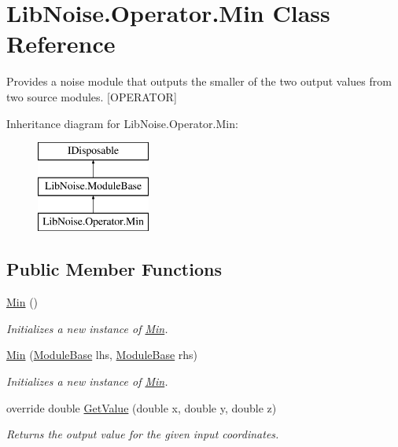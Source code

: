 \hypertarget{class_lib_noise_1_1_operator_1_1_min}{}\section{Lib\+Noise.\+Operator.\+Min Class Reference}
\label{class_lib_noise_1_1_operator_1_1_min}


Provides a noise module that outputs the smaller of the two output values from two source modules. \mbox{[}O\+P\+E\+R\+A\+T\+OR\mbox{]}  


Inheritance diagram for Lib\+Noise.\+Operator.\+Min\+:\begin{figure}[H]
\begin{center}
\leavevmode
\includegraphics[height=3.000000cm]{class_lib_noise_1_1_operator_1_1_min}
\end{center}
\end{figure}
\subsection*{Public Member Functions}
\begin{DoxyCompactItemize}
\item 
\hyperlink{class_lib_noise_1_1_operator_1_1_min_a9683967df18c7c820b31389698c4090d}{Min} ()
\begin{DoxyCompactList}\small\item\em Initializes a new instance of \hyperlink{class_lib_noise_1_1_operator_1_1_min}{Min}. \end{DoxyCompactList}\item 
\hyperlink{class_lib_noise_1_1_operator_1_1_min_a5b268244f99e10a2a15623b274d1135e}{Min} (\hyperlink{class_lib_noise_1_1_module_base}{Module\+Base} lhs, \hyperlink{class_lib_noise_1_1_module_base}{Module\+Base} rhs)
\begin{DoxyCompactList}\small\item\em Initializes a new instance of \hyperlink{class_lib_noise_1_1_operator_1_1_min}{Min}. \end{DoxyCompactList}\item 
override double \hyperlink{class_lib_noise_1_1_operator_1_1_min_a37ad950da95db819e1407d06e0758256}{Get\+Value} (double x, double y, double z)
\begin{DoxyCompactList}\small\item\em Returns the output value for the given input coordinates. \end{DoxyCompactList}\end{DoxyCompactItemize}
